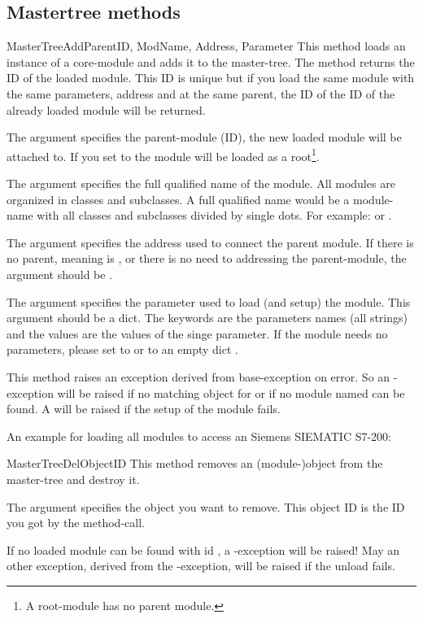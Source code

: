 \subsection{Mastertree methods}
\begin{methoddesc}[Core]{MasterTreeAdd}{ParentID, ModName, Address, Parameter}
This method loads an instance of a core-module and adds it to the master-tree. 
The method returns the ID of the loaded module. This ID is unique but if you 
load the same module with the same parameters, address and at the same parent, 
the ID of the ID of the already loaded module will be returned.

The argument  specifies the parent-module (ID), the new loaded 
module will be attached to. If you set  to  the 
module will be loaded as a root\footnote{A root-module has no parent module.}. 

The argument  specifies the full qualified name of the module. 
All modules are organized in classes and subclasses. A full qualified name 
would be a module-name with all classes and subclasses divided by single dots. 
For example:  or .

The argument  specifies the address used to connect the parent 
module. If there is no parent, meaning  is , or there
is no need to addressing the parent-module, the argument  should 
be .

The argument  specifies the parameter used to load (and setup) 
the module. This argument should be a dict.  The keywords are the parameters 
names (all strings) and the values are the values of the singe parameter.  
 If the module needs no parameters, 
please set  to  or to an empty dict \code{\{\}}.

This method raises an exception derived from base-exception  
on error. So an -exception will be raised if no 
matching object for  or if no module named  can be 
found. A  will be raised if the setup of the module
fails. 

An example for loading all modules to access an Siemens SIEMATIC S7-200:

\end{methoddesc}


\begin{methoddesc}[Core]{MasterTreeDel}{ObjectID}
This method removes an (module-)object from the master-tree and destroy it. 

The argument  specifies the object you want to remove. This 
object ID is the ID you got by the  method-call.

If no loaded module can be found with id , a 
-exception will be raised! May an other
exception, derived from the -exception, will be
raised if the unload fails.
\end{methoddesc}


